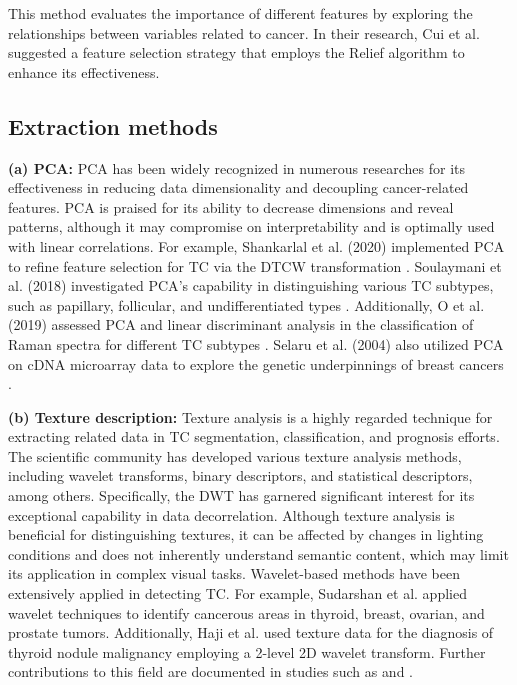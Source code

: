 \documentclass[a4paper,fleqn]{cas-sc}
\begin{document}
This method evaluates the importance of different features by exploring the relationships between variables related to cancer. In their research, Cui et al. \cite{cui2018ovarian} suggested a feature selection strategy that employs the Relief algorithm to enhance its effectiveness.

\subsection{Extraction methods}

\noindent \textbf{(a) \Acf{PCA}:} \ac{PCA} has been widely recognized in numerous researches for its effectiveness in reducing data dimensionality and decoupling cancer-related features. \ac{PCA} is praised for its ability to decrease dimensions and reveal patterns, although it may compromise on interpretability and is optimally used with linear correlations. For example, Shankarlal et al. (2020) implemented \ac{PCA} to refine feature selection for TC via the \ac{DTCW} transformation \cite{shankarlal2020performance}. Soulaymani et al. (2018) investigated \ac{PCA}'s capability in distinguishing various TC subtypes, such as papillary, follicular, and undifferentiated types \cite{soulaymani2018epidemiological}. Additionally, O et al. (2019) assessed \ac{PCA} and linear discriminant analysis in the classification of Raman spectra for different TC subtypes \cite{o2019raman}. Selaru et al. (2004) also utilized \ac{PCA} on cDNA microarray data to explore the genetic underpinnings of breast cancers \cite{selaru2004unsupervised}.

\noindent \textbf{(b)  Texture description:}
Texture analysis is a highly regarded technique for extracting related data in TC segmentation, classification, and prognosis efforts. The scientific community has developed various texture analysis methods, including wavelet transforms, binary descriptors, and statistical descriptors, among others. Specifically, the \ac{DWT} has garnered significant interest for its exceptional capability in data decorrelation. Although texture analysis is beneficial for distinguishing textures, it can be affected by changes in lighting conditions and does not inherently understand semantic content, which may limit its application in complex visual tasks. Wavelet-based methods have been extensively applied in detecting TC. For example, Sudarshan et al. \cite{sudarshan2016application} applied wavelet techniques to identify cancerous areas in thyroid, breast, ovarian, and prostate tumors. Additionally, Haji et al. \cite{haji2019novel} used texture data for the diagnosis of thyroid nodule malignancy employing a 2-level 2D wavelet transform. Further contributions to this field are documented in studies such as \cite{yu2019transverse} and \cite{nguyen2019artificial}.
\end{document}

